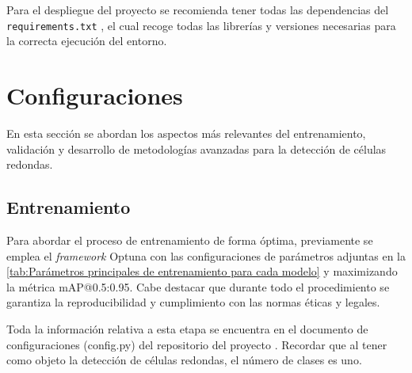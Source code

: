 \documentclass[12pt,a4paper,onecolumn,oneside]{report}
\begin{document}
Para el despliegue del proyecto se recomienda tener todas las dependencias del \texttt{requirements.txt} \cite{repoTFM}, el cual 
recoge todas las librerías y versiones necesarias para la correcta ejecución del entorno.

\section{Configuraciones}
\label{sec:Configuraciones}

En esta sección se abordan los aspectos más relevantes del entrenamiento, validación y desarrollo de metodologías avanzadas para la detección de células redondas.

\subsection{Entrenamiento}
\label{sec:Entrenamiento}

Para abordar el proceso de entrenamiento de forma óptima, previamente se emplea el \textit{framework} Optuna \cite{Optuna} con las configuraciones de parámetros adjuntas en la \autoref{tab:Parámetros principales de entrenamiento para cada modelo} y
maximizando la métrica mAP@0.5:0.95. Cabe destacar que durante todo el procedimiento se garantiza la reproducibilidad y cumplimiento con las normas éticas y legales.

Toda la información relativa a esta etapa se encuentra en el documento de configuraciones (config.py) del repositorio
del proyecto \cite{repoTFM}. Recordar que al tener como objeto la detección de células redondas, el número de clases es uno.
\end{document}
